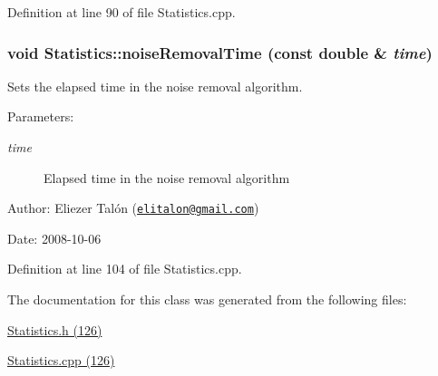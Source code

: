Definition at line 90 of file Statistics.cpp.\hypertarget{class_statistics_4ad24aec4e5491b7d3afca143e6deb05}{
\subsubsection[noiseRemovalTime]{\setlength{\rightskip}{0pt plus 5cm}void Statistics::noiseRemovalTime (const double \& {\em time})}}
\label{class_statistics_4ad24aec4e5491b7d3afca143e6deb05}


Sets the elapsed time in the noise removal algorithm. 

\begin{Desc}
\item[Parameters:]
\begin{description}
\item[{\em time}]Elapsed time in the noise removal algorithm\end{description}
\end{Desc}
\begin{Desc}
\item[Author:]Eliezer Talón (\href{mailto:elitalon@gmail.com}{\tt elitalon@gmail.com}) \end{Desc}
\begin{Desc}
\item[Date:]2008-10-06 \end{Desc}


Definition at line 104 of file Statistics.cpp.

The documentation for this class was generated from the following files:\begin{CompactItemize}
\item 
\hyperlink{_statistics_8h}{Statistics.h (126)}\item 
\hyperlink{_statistics_8cpp}{Statistics.cpp (126)}\end{CompactItemize}
